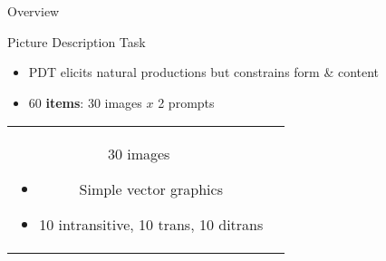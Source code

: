 \documentclass[final,14pt,t]{beamer}
\begin{document}
\begin{frame}{}
\begin{columns}[t]
\begin{column}{.33\linewidth}
\begin{minipage}[t][\textheight]{\linewidth}
\begin{block}{Overview}
\begin{center}
\begin{minipage}{.85\textwidth}
\end{minipage}
\end{center}
\end{block}



\begin{block}{Picture Description Task}
\begin{center}
\begin{minipage}{.85\textwidth}

  \vspace{1em}
  \begin{itemize}
  \item{PDT elicits natural productions but constrains form \& content}
  \vspace{.6em}
  \item{60 \textbf{items}: 30 images $x$ 2 prompts}
  \vspace{.6em}
  \end{itemize}
  \begin{tabular}{cc}
  \vspace{1em}
    \begin{minipage}{.45\textwidth}
      \begin{center}
        \vspace{1ex}
        30 images
      \end{center}
        \vspace{-1ex}
    \begin{itemize}
    \item Simple vector graphics
    \item 10 intransitive, 10 trans, 10 ditrans
    \end{itemize}

\end{minipage}
\end{tabular}
\end{minipage}
\end{center}
\end{block}
\end{minipage}
\end{column}
\end{columns}
\end{frame}
\end{document}
